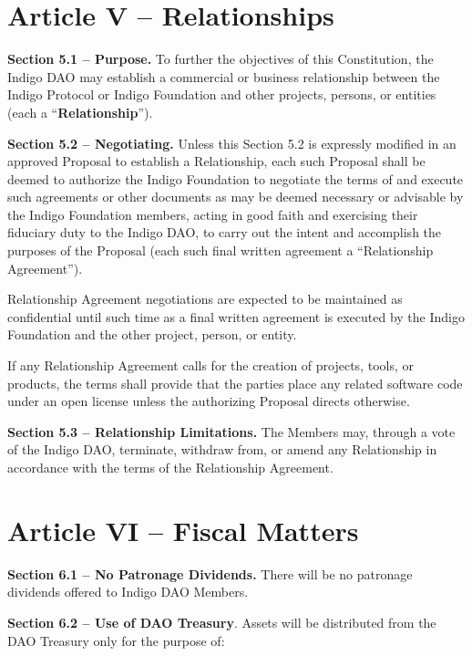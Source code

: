 \hypertarget{article-v-relationships}{%
\section{Article V -- Relationships}\label{article-v-relationships}}

\textbf{Section 5.1 -- Purpose.} To further the objectives of this
Constitution, the Indigo DAO may establish a commercial or business
relationship between the Indigo Protocol or Indigo Foundation and other
projects, persons, or entities (each a ``\textbf{Relationship}'').

\textbf{Section 5.2 -- Negotiating.} Unless this Section 5.2 is
expressly modified in an approved Proposal to establish a Relationship,
each such Proposal shall be deemed to authorize the Indigo Foundation to
negotiate the terms of and execute such agreements or other documents as
may be deemed necessary or advisable by the Indigo Foundation members,
acting in good faith and exercising their fiduciary duty to the Indigo
DAO, to carry out the intent and accomplish the purposes of the Proposal
(each such final written agreement a ``Relationship Agreement'').

Relationship Agreement negotiations are expected to be maintained as
confidential until such time as a final written agreement is executed by
the Indigo Foundation and the other project, person, or entity.

If any Relationship Agreement calls for the creation of projects, tools,
or products, the terms shall provide that the parties place any related
software code under an open license unless the authorizing Proposal
directs otherwise.

\textbf{Section 5.3 -- Relationship Limitations.} The Members may,
through a vote of the Indigo DAO, terminate, withdraw from, or amend any
Relationship in accordance with the terms of the Relationship Agreement.

\hypertarget{article-vi-fiscal-matters}{%
\section{Article VI -- Fiscal Matters}\label{article-vi-fiscal-matters}}

\textbf{Section 6.1 -- No Patronage Dividends.} There will be no
patronage dividends offered to Indigo DAO Members.

\textbf{Section 6.2 -- Use of DAO Treasury}. Assets will be distributed
from the DAO Treasury only for the purpose of:

